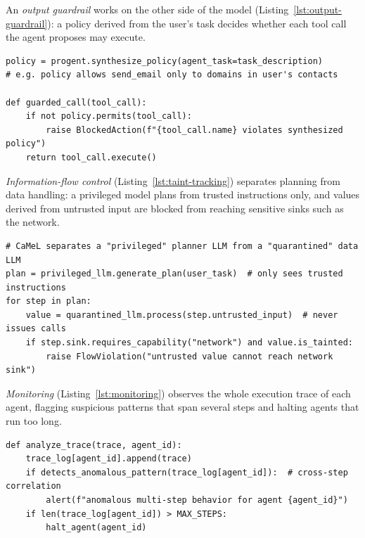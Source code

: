 An \emph{output guardrail} works on the other side of the model (Listing~\ref{lst:output-guardrail}): a policy derived from the user's task decides whether each tool call the agent proposes may execute.

\noindent\begin{minipage}{\linewidth}
\begin{lstlisting}[caption={Output guardrails: policy synthesis over tool calls, in the style of Progent~\cite{shi2025progent}.}, label={lst:output-guardrail}]
policy = progent.synthesize_policy(agent_task=task_description)
# e.g. policy allows send_email only to domains in user's contacts

def guarded_call(tool_call):
    if not policy.permits(tool_call):
        raise BlockedAction(f"{tool_call.name} violates synthesized policy")
    return tool_call.execute()
\end{lstlisting}
\end{minipage}

\emph{Information-flow control} (Listing~\ref{lst:taint-tracking}) separates planning from data handling: a privileged model plans from trusted instructions only, and values derived from untrusted input are blocked from reaching sensitive sinks such as the network.

\noindent\begin{minipage}{\linewidth}
\begin{lstlisting}[caption={Information-flow control: capability-based dataflow enforcement, in the style of CaMeL~\cite{debenedetti2025camel}.}, label={lst:taint-tracking}]
# CaMeL separates a "privileged" planner LLM from a "quarantined" data LLM
plan = privileged_llm.generate_plan(user_task)  # only sees trusted instructions
for step in plan:
    value = quarantined_llm.process(step.untrusted_input)  # never issues calls
    if step.sink.requires_capability("network") and value.is_tainted:
        raise FlowViolation("untrusted value cannot reach network sink")
\end{lstlisting}
\end{minipage}

\emph{Monitoring} (Listing~\ref{lst:monitoring}) observes the whole execution trace of each agent, flagging suspicious patterns that span several steps and halting agents that run too long.

\noindent\begin{minipage}{\linewidth}
\begin{lstlisting}[caption={Monitoring: analyzing multi-agent execution traces for threats invisible at any single step~\cite{kim2026sok}.}, label={lst:monitoring}]
def analyze_trace(trace, agent_id):
    trace_log[agent_id].append(trace)
    if detects_anomalous_pattern(trace_log[agent_id]):  # cross-step correlation
        alert(f"anomalous multi-step behavior for agent {agent_id}")
    if len(trace_log[agent_id]) > MAX_STEPS:
        halt_agent(agent_id)
\end{lstlisting}
\end{minipage}

